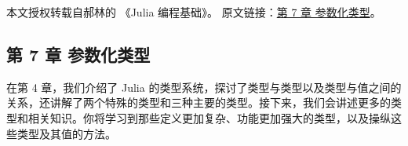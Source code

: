 
本文授权转载自郝林的 《Julia 编程基础》。 原文链接：\href{https://github.com/hyper0x/JuliaBasics/blob/master/book/ch07.md}{第 7 章 参数化类型}。


\subsection{第 7 章 参数化类型}

在第 4 章，我们介绍了 Julia 的类型系统，探讨了类型与类型以及类型与值之间的关系，还讲解了两个特殊的类型和三种主要的类型。接下来，我们会讲述更多的类型和相关知识。你将学习到那些定义更加复杂、功能更加强大的类型，以及操纵这些类型及其值的方法。
